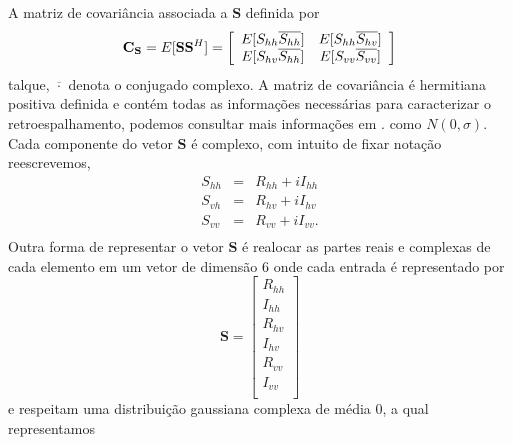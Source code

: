 \documentclass[conference]{IEEEtran}
\begin{document}
A matriz de covariância associada a $\mathbf{S}$ definida por
\begin{equation}
	{\bf C_{{\bf S}}} = E[{\mathbf S}{\mathbf S}^H] = \left[
\begin{array}{cc}
	E[S_{hh}\overline{S_{hh}}]  & E[{S_{hh}}\overline{S_{hv}}]   \\
	E[S_{hv}\overline{S_{hh}}]  & E[{S_{vv}}\overline{S_{vv}}]  \\
\end{array}
\right]
\end{equation}
talque, $\overline{\cdot}$ denota o conjugado complexo. A matriz de covariância é hermitiana positiva definida e contém todas as informações necessárias para caracterizar o retroespalhamento, podemos consultar mais informações em \cite{mfp}. como $N(0,\sigma)$.
Cada componente do vetor $\mathbf{S}$ é complexo, com intuito de fixar notação reescrevemos,
\begin{equation}
\begin{array}{ccc}
	S_{hh} &=& R_{hh} + i I_{hh}    \\
    S_{vh} &=& R_{hv} + i I_{hv}   \\
	S_{vv} &=& R_{vv} + i I_{vv}.   \\
\end{array}
\end{equation}
Outra forma de representar o vetor $\mathbf{S}$ é realocar as partes reais e complexas de cada elemento em um vetor de dimensão $6$ onde cada entrada é representado por
\begin{equation}
\mathbf{S} = \left[
\begin{array}{c}
	R_{hh}     \\
    I_{hh}     \\
	R_{hv}     \\
	I_{hv}     \\
    R_{vv}     \\
	I_{vv}     \\
\end{array}
\right]
\end{equation}
e respeitam uma distribuição gaussiana complexa de média 0, a qual representamos 
\end{document}
